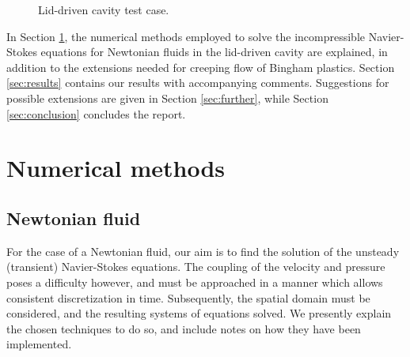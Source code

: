 \documentclass[final,3p,twocolumn]{elsarticle}
\begin{document}
\begin{figure}[htb]
    \centering
    \caption{Lid-driven cavity test case.}
    \label{fig:lidDrivenCavity}
\end{figure}

In Section \ref{sec:numerical}, the numerical methods employed to solve the
incompressible Navier-Stokes equations for Newtonian fluids in the lid-driven
cavity are explained, in addition to the extensions needed for creeping flow of
Bingham plastics. Section \ref{sec:results} contains our results with
accompanying comments. Suggestions for possible extensions are given in Section
\ref{sec:further}, while Section \ref{sec:conclusion} concludes the report. 

\section{Numerical methods}
\label{sec:numerical}

\subsection{Newtonian fluid}
\label{subsec:newtonian}

For the case of a Newtonian fluid, our aim is to find the solution of the
unsteady (transient) Navier-Stokes equations. The coupling of the velocity and
pressure poses a difficulty however, and must be approached in a manner which
allows consistent discretization in time. Subsequently, the spatial domain must
be considered, and the resulting systems of equations solved.  We presently
explain the chosen techniques to do so, and include notes on how they have been
implemented. 
\end{document}
